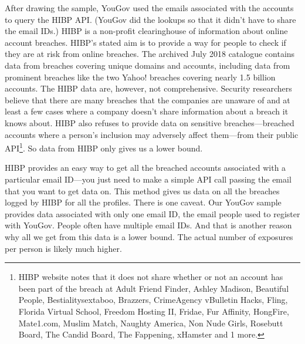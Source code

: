\documentclass[sigconf]{acmart}
\begin{document}
After drawing the sample, YouGov used the emails associated with the accounts to query the HIBP API. (YouGov did the lookups so that it didn't have to share the email IDs.) HIBP is a non-profit clearinghouse of information about online account breaches. HIBP's stated aim is to provide a way for people to check if they are at risk from online breaches. The archived July 2018 catalogue contains data from \catalogCount{} breaches covering \catalogDomains{} unique domains and \catalogAccounts{} accounts, including data from prominent breaches like the two Yahoo! breaches covering nearly 1.5 billion accounts. The HIBP data are, however, not comprehensive. Security researchers believe that there are many breaches that the companies are unaware of and at least a few cases where a company doesn't share information about a breach it knows about. HIBP also refuses to provide data on sensitive breaches---breached accounts where a person's inclusion may adversely affect them---from their public API\footnote{HIBP website notes that it does not share whether or not an account has been part of the breach at Adult Friend Finder, Ashley Madison, Beautiful People, Bestialitysextaboo, Brazzers, CrimeAgency vBulletin Hacks, Fling, Florida Virtual School, Freedom Hosting II, Fridae, Fur Affinity, HongFire, Mate1.com, Muslim Match, Naughty America, Non Nude Girls, Rosebutt Board, The Candid Board, The Fappening, xHamster and 1 more.}.  So data from HIBP only gives us a lower bound.

HIBP provides an easy way to get all the breached accounts associated with a particular email ID---you just need to make a simple API call passing the email that you want to get data on. This method gives us data on all the breaches logged by HIBP for all the \sampleSize{} profiles. There is one caveat.  Our YouGov sample provides data associated with only one email ID, the email people used to register with YouGov. People often have multiple email IDs. And that is another reason why all we get from this data is a lower bound. The actual number of exposures per person is likely much higher.
\end{document}
